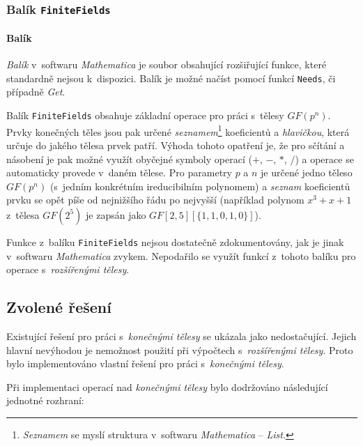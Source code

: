 \documentclass[thesis=M,czech,hidelinks]{FITthesis}[2012/06/26]
\newcommand{\0}{{\textcolor[gray]{0.80}{0}}}
\begin{document}
\subsubsection{Balík \texttt{FiniteFields}}

\paragraph{Balík} \emph{Balík} v~softwaru \emph{Mathematica} je soubor
obsahující rozšiřující funkce, které standardně nejsou k~dispozici. Balík je
možné načíst pomocí funkcí \texttt{Needs}, či případně \emph{Get}.

Balík \texttt{FiniteFields} obsahuje základní operace pro práci s~tělesy
$GF(p^n)$. Prvky konečných těles jsou pak určené \emph{seznamem}\footnote{
    \emph{Seznamem} se myslí struktura v~softwaru \emph{Mathematica}
    -- \emph{List}.
} koeficientů a \emph{hlavičkou}, která určuje do jakého tělesa prvek patří.
Výhoda tohoto opatření je, že pro sčítání a násobení je pak možné využít
obyčejné symboly operací ($+$, $-$, $*$, $/$) a operace se automaticky provede
v~daném tělese.  Pro parametry $p$ a $n$ je určené jedno těleso $GF(p^n)$
(s~jedním konkrétním ireducibilním polynomem) a \emph{seznam} koeficientů prvku
se opět píše od nejnižšího řádu po nejvyšší (například polynom $x^3 + x + 1$
z~tělesa $GF(2^5)$ je zapsán jako $GF[2,5][\{1,1,0,1,0\}] $).

Funkce z~balíku \texttt{FiniteFields} nejsou dostatečně zdokumentovány, jak je
jinak v~softwaru \emph{Mathematica} zvykem. Nepodařilo se využít funkcí z~tohoto
balíku pro operace s~\emph{rozšířenými tělesy}.

\subsection{Zvolené řešení}

Existující řešení pro práci s~\emph{konečnými tělesy} se ukázala jako
nedostačující. Jejich hlavní nevýhodou je nemožnost použití při výpočtech
s~\emph{rozšířenými tělesy}. Proto bylo implementováno vlastní řešení pro práci
s~\emph{konečnými tělesy}.

Při implementaci operací nad \emph{konečnými tělesy} bylo dodržováno následující
jednotné rozhraní:
\end{document}
